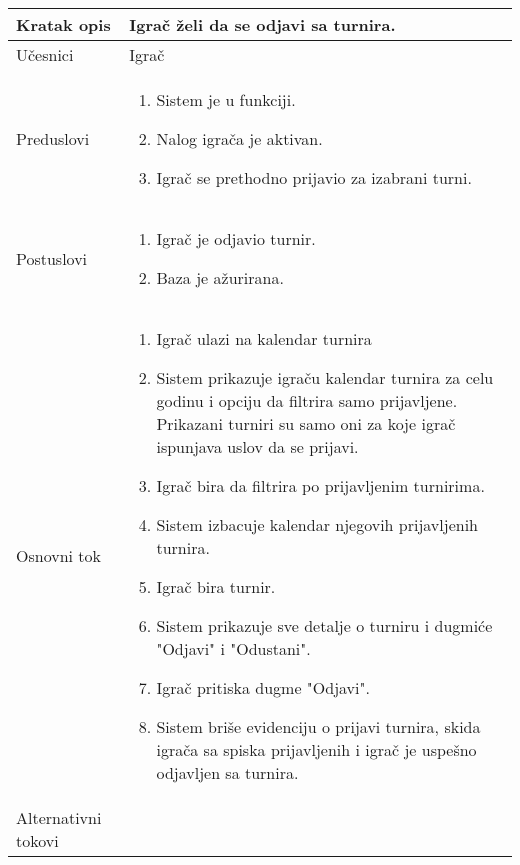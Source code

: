 \documentclass{article}
\begin{document}
        \begin{longtable}{| p{} | p{} |} 
            \hline
                Kratak opis & Igrač želi da se odjavi sa turnira.\\ 
            \hline    
                Učesnici & Igrač \\
            \hline
               Preduslovi & \begin{enumerate}
                   \item Sistem je u funkciji.
                   \item Nalog igrača je aktivan.
                   \item Igrač se prethodno prijavio za izabrani turni.
               \end{enumerate}\\
            \hline  
                Postuslovi & \begin{enumerate}
                    \item Igrač je odjavio turnir.
                    \item Baza je ažurirana.
                \end{enumerate}\\
            \hline
                Osnovni tok & \begin{enumerate}
                    \item Igrač ulazi na kalendar turnira
                    \item Sistem prikazuje igraču kalendar turnira za celu godinu i opciju da filtrira samo prijavljene. Prikazani turniri su samo oni za koje igrač ispunjava uslov da se prijavi.
                    \item Igrač bira da filtrira po prijavljenim turnirima.
                    \item Sistem izbacuje kalendar njegovih prijavljenih turnira.
                    \item Igrač bira turnir.
                    \item Sistem prikazuje sve detalje o turniru i dugmiće "Odjavi" i "Odustani".
                    \item Igrač pritiska dugme "Odjavi".        
                    \item Sistem briše evidenciju o prijavi turnira, skida igrača sa spiska prijavljenih i igrač je uspešno odjavljen sa turnira.
                \end{enumerate}\\
            \hline
                Alternativni tokovi & 

\end{longtable}
\end{document}

